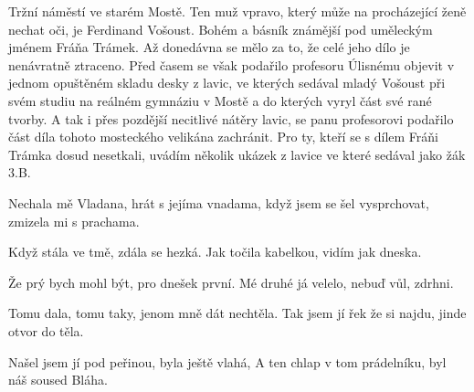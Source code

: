 
Tržní náměstí ve starém Mostě. Ten muž vpravo, který může na
procházející ženě nechat oči, je Ferdinand Vošoust. Bohém a básník
známější pod uměleckým jménem Fráňa Trámek. Až donedávna se mělo za
to, že celé jeho dílo je nenávratně ztraceno. Před časem se však
podařilo profesoru Úlisnému objevit v jednom opuštěném skladu desky z
lavic, ve kterých sedával mladý Vošoust při svém studiu na reálném
gymnáziu v Mostě a do kterých vyryl část své rané tvorby. A tak i přes
pozdější necitlivé nátěry lavic, se panu profesorovi podařilo část
díla tohoto mosteckého velikána zachránit. Pro ty, kteří se s dílem
Fráňi Trámka dosud nesetkali, uvádím několik ukázek z lavice ve které
sedával jako žák 3.B.

Nechala mě Vladana,
hrát s jejíma vnadama,
když jsem se šel vysprchovat,
zmizela mi s prachama.

Když stála ve tmě,
zdála se hezká.
Jak točila kabelkou,
vidím jak dneska.

Že prý bych mohl být,
pro dnešek první.
Mé druhé já velelo,
nebuď vůl, zdrhni.

Tomu dala, tomu taky,
jenom mně dát nechtěla.
Tak jsem jí řek že si najdu,
jinde otvor do těla.

Našel jsem jí pod peřinou,
byla ještě vlahá,
A ten chlap v tom prádelníku,
byl náš soused Bláha.
